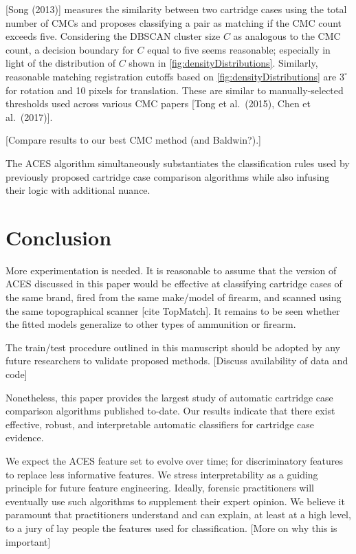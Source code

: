 \documentclass[
]{jdssv}
\begin{document}
{[}Song (2013){]} measures the similarity between two cartridge cases
using the total number of CMCs and proposes classifying a pair as
matching if the CMC count exceeds five. Considering the DBSCAN cluster
size \(C\) as analogous to the CMC count, a decision boundary for \(C\)
equal to five seems reasonable; especially in light of the distribution
of \(C\) shown in \autoref{fig:densityDistributions}. Similarly,
reasonable matching registration cutoffs based on
\autoref{fig:densityDistributions} are \(3^\circ\) for rotation and 10
pixels for translation. These are similar to manually-selected
thresholds used across various CMC papers {[}Tong et al.~(2015), Chen et
al.~(2017){]}.

{[}Compare results to our best CMC method (and Baldwin?).{]}

The ACES algorithm simultaneously substantiates the classification rules
used by previously proposed cartridge case comparison algorithms while
also infusing their logic with additional nuance.

\hypertarget{conclusion}{%
\section{Conclusion}\label{conclusion}}

More experimentation is needed. It is reasonable to assume that the
version of ACES discussed in this paper would be effective at
classifying cartridge cases of the same brand, fired from the same
make/model of firearm, and scanned using the same topographical scanner
{[}cite TopMatch{]}. It remains to be seen whether the fitted models
generalize to other types of ammunition or firearm.

The train/test procedure outlined in this manuscript should be adopted
by any future researchers to validate proposed methods. {[}Discuss
availability of data and code{]}

Nonetheless, this paper provides the largest study of automatic
cartridge case comparison algorithms published to-date. Our results
indicate that there exist effective, robust, and interpretable automatic
classifiers for cartridge case evidence.

We expect the ACES feature set to evolve over time; for discriminatory
features to replace less informative features. We stress
interpretability as a guiding principle for future feature engineering.
Ideally, forensic practitioners will eventually use such algorithms to
supplement their expert opinion. We believe it paramount that
practitioners understand and can explain, at least at a high level, to a
jury of lay people the features used for classification. {[}More on why
this is important{]}
\end{document}
